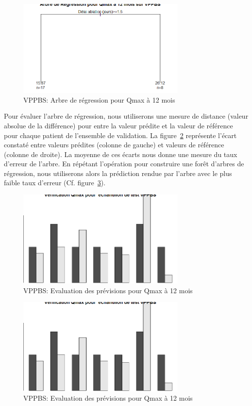 \begin{figure}[H]
\centering
\includegraphics[width=0.75\textwidth]{../Fig/VPPBS/vppbs-regtree-qmax12.png}
\caption{VPPBS: Arbre de régression pour Qmax à 12 mois}
\label{fig-vppbs-regtree-qmax12}
\end{figure}

Pour évaluer l'arbre de régression, nous utiliserons une mesure de distance (valeur absolue de la différence) pour entre la valeur prédite et la valeur de référence pour chaque patient de l'ensemble de validation. 
La figure~\ref{fig-vppbs-regtree-test-qmax12} représente l'écart constaté entre valeurs prédites (colonne de gauche) et valeurs de référence (colonne de droite). La moyenne de ces écarts nous donne une mesure du taux d'erreur de l'arbre. En répétant l'opération pour construire une forêt d'arbres de régression, nous utiliserons alors la prédiction rendue par l'arbre avec le plus faible taux d'erreur (Cf. figure~\ref{fig-vppbs-forest-test-qmax12}).

\begin{figure}[H]
\centering
\includegraphics[width=0.75\textwidth]{../Fig/VPPBS/vppbs-regtree-test-qmax12.png}
\caption{VPPBS: Evaluation des prévisions pour Qmax à 12 mois}
\label{fig-vppbs-regtree-test-qmax12}
\end{figure}

\begin{figure}[H]
\centering
\includegraphics[width=0.75\textwidth]{../Fig/VPPBS/vppbs-regtree-test-qmax12.png}
\caption{VPPBS: Evaluation des prévisions pour Qmax à 12 mois}
\label{fig-vppbs-forest-test-qmax12}
\end{figure}

